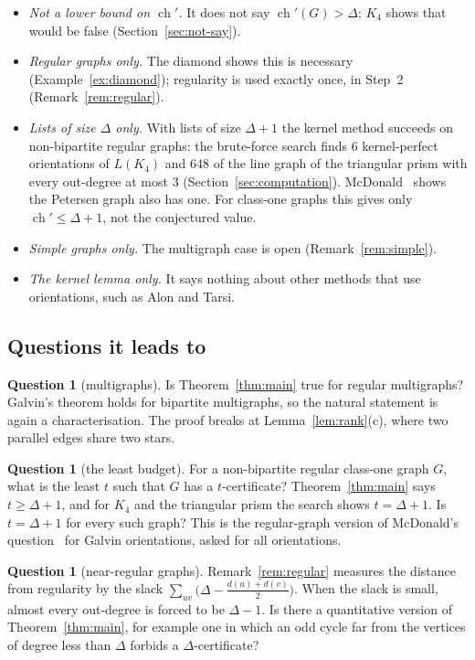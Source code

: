 \documentclass[11pt]{article}
\theoremstyle{plain}
\theoremstyle{definition}
\newtheorem{question}[theorem]{Question}
\theoremstyle{remark}
\newcommand{\chil}{\operatorname{ch}'}
\begin{document}
\begin{itemize}
  \item \emph{Not a lower bound on $\chil$.} It does not say $\chil(G)>\Delta$; $K_4$ shows that
    would be false (Section~\ref{sec:not-say}).
  \item \emph{Regular graphs only.} The diamond shows this is necessary
    (Example~\ref{ex:diamond}); regularity is used exactly once, in Step~2
    (Remark~\ref{rem:regular}).
  \item \emph{Lists of size $\Delta$ only.} With lists of size $\Delta+1$ the kernel method
    succeeds on non-bipartite regular graphs: the brute-force search finds $6$ kernel-perfect
    orientations of $L(K_4)$ and $648$ of the line graph of the triangular prism with every
    out-degree at most $3$ (Section~\ref{sec:computation}). McDonald~\cite[Theorem~4]{mcd}
    shows the Petersen graph also has one. For class-one graphs this gives only $\chil\le\Delta+1$, not the
    conjectured value.
  \item \emph{Simple graphs only.} The multigraph case is open (Remark~\ref{rem:simple}).
  \item \emph{The kernel lemma only.} It says nothing about other methods that use orientations,
    such as Alon and Tarsi.
\end{itemize}

\subsection{Questions it leads to}

\begin{question}[multigraphs]
Is Theorem~\ref{thm:main} true for regular multigraphs? Galvin's theorem holds for bipartite
multigraphs, so the natural statement is again a characterisation. The proof breaks at
Lemma~\ref{lem:rank}(c), where two parallel edges share two stars.
\end{question}

\begin{question}[the least budget]
For a non-bipartite regular class-one graph $G$, what is the least $t$ such that $G$ has a
$t$-certificate? Theorem~\ref{thm:main} says $t\ge\Delta+1$, and for $K_4$ and the triangular
prism the search shows $t=\Delta+1$. Is $t=\Delta+1$ for every such graph? This is the
regular-graph version of McDonald's question~\cite{mcd} for Galvin orientations, asked for all
orientations.
\end{question}

\begin{question}[near-regular graphs]
Remark~\ref{rem:regular} measures the distance from regularity by the slack
$\sum_{uv}\bigl(\Delta-\tfrac{d(u)+d(v)}{2}\bigr)$. When the slack is small, almost every
out-degree is forced to be $\Delta-1$. Is there a quantitative version of
Theorem~\ref{thm:main}, for example one in which an odd cycle far from the vertices of degree
less than $\Delta$ forbids a $\Delta$-certificate?
\end{question}
\end{document}
